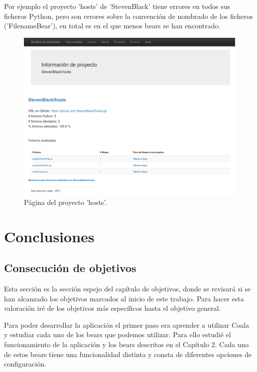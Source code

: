 \documentclass[a4paper, 12pt]{book}
\begin{document}
Por ejemplo el proyecto 'hosts' de 'StevenBlack' tiene errores en todos sus ficheros Python, pero son errores sobre la convención de nombrado de los ficheros ('FilenameBear'), en total es en el que menos bears se han encontrado.
\begin{figure}[h]
  \centering
  \includegraphics[width=15cm, keepaspectratio]{img/proyectoHosts}
  \caption{Página del proyecto 'hosts'.}
  \label{fig:proyectoHosts}
\end{figure}


\cleardoublepage
\chapter{Conclusiones}
\label{chap:conclusiones}


\section{Consecución de objetivos}
\label{sec:consecucion-objetivos}

Esta sección es la sección espejo del capítulo de objetivos, donde se revisará si se han alcanzado los objetivos marcados al inicio de este trabajo. Para hacer esta valoración iré de los objetivos más específicos hasta el objetivo general.

Para poder desarrollar la aplicación el primer paso era aprender a utilizar Coala y estudiar cada uno de los bears que podemos utilizar. Para ello estudié el funcionamiento de la aplicación y los bears descritos en el Capítulo 2. Cada uno de estos bears tiene una funcionalidad distinta y consta de diferentes opciones de configuración.
\end{document}
